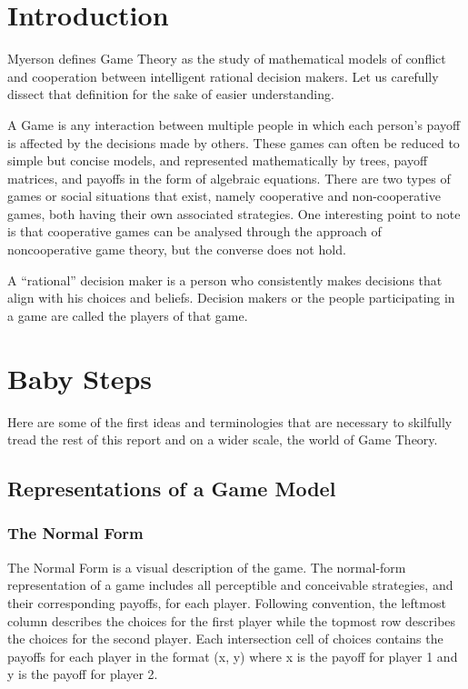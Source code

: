 \documentclass[11pt]{article}
\theoremstyle{definition}
\begin{document}
\newpage

\section{Introduction}

Myerson defines Game Theory as the study of mathematical models of conflict and cooperation between intelligent rational decision makers. Let us carefully dissect that definition for the sake of easier understanding. 

A Game is any interaction between multiple people in which each person's payoff is affected by the decisions made by others. These games can often be reduced to simple but concise models, and represented mathematically by trees, payoff matrices, and payoffs in the form of algebraic equations. There are two types of games or social situations that exist, namely cooperative and non-cooperative games, both having their own associated strategies. One interesting point to note is that cooperative games can be analysed through the approach of noncooperative game theory, but the converse does not hold. 

A “rational” decision maker is a person who consistently makes decisions that align with his choices and beliefs. Decision makers or the people participating in a game are called the players of that game.

\section{Baby Steps}

Here are some of the first ideas and terminologies that are necessary to skilfully tread the rest of this report and on a wider scale, the world of Game Theory.

\subsection{Representations of a Game Model}

\subsubsection{The Normal Form}
The Normal Form is a visual description of the game. The normal-form representation of a game includes all perceptible and conceivable strategies, and their corresponding payoffs, for each player.
Following convention, the leftmost column describes the choices for the first player while the topmost row describes the choices for the second player. Each intersection cell of choices contains the payoffs for each player in the format (x, y) where x is the payoff for player 1 and y is the payoff for player 2.
\end{document}
